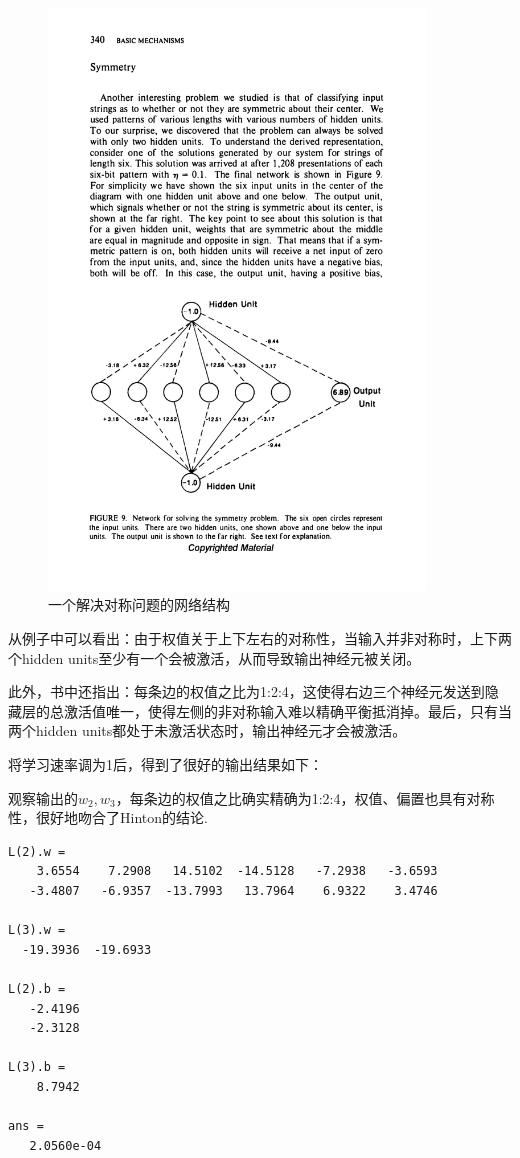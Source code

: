 \begin{figure}[H]
\centering
\includegraphics[width=10cm]{fig/symmetry0.pdf}
\caption{一个解决对称问题的网络结构}
\end{figure}
从例子中可以看出：由于权值关于上下左右的对称性，当输入并非对称时，上下两个hidden units至少有一个会被激活，从而导致输出神经元被关闭。

此外，书中还指出：每条边的权值之比为1:2:4，这使得右边三个神经元发送到隐藏层的总激活值唯一，使得左侧的非对称输入难以精确平衡抵消掉。最后，只有当两个hidden units都处于未激活状态时，输出神经元才会被激活。

将学习速率调为1后，得到了很好的输出结果如下：

观察输出的$w_2,w_3$，每条边的权值之比确实精确为1:2:4，权值、偏置也具有对称性，很好地吻合了Hinton的结论.
\begin{lstlisting}
L(2).w =
    3.6554    7.2908   14.5102  -14.5128   -7.2938   -3.6593
   -3.4807   -6.9357  -13.7993   13.7964    6.9322    3.4746

L(3).w =
  -19.3936  -19.6933

L(2).b =
   -2.4196
   -2.3128

L(3).b =
    8.7942
   
ans =
   2.0560e-04
\end{lstlisting}


